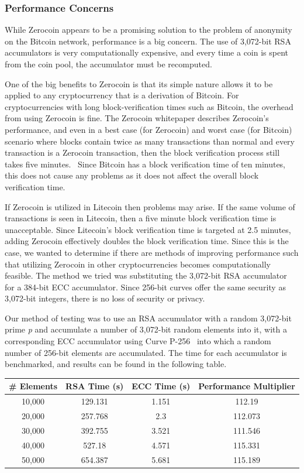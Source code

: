 \documentclass[11pt]{article}
\begin{document}
\subsubsection{Performance Concerns}
While Zerocoin appears to be a promising solution to the problem of anonymity on the Bitcoin network, performance is a
big concern. The use of 3,072-bit RSA accumulators is very computationally expensive, and every time a coin is spent
from the coin pool, the accumulator must be recomputed.

One of the big benefits to Zerocoin is that its simple nature allows it to be applied to any cryptocurrency that is a
derivation of Bitcoin. For cryptocurrencies with long block-verification times such as Bitcoin, the overhead from using
Zerocoin is fine. The Zerocoin whitepaper describes Zerocoin's performance, and even in a best case (for Zerocoin) and
worst case (for Bitcoin) scenario where blocks contain twice as many transactions than normal and every transaction is a
Zerocoin transaction, then the block verification process still takes five minutes.~\cite{miers13} Since Bitcoin has a
block verification time of ten minutes, this does not cause any problems as it does not affect the overall block
verification time.

If Zerocoin is utilized in Litecoin then problems may arise. If the same volume of transactions is seen in Litecoin,
then a five minute block verification time is unacceptable. Since Litecoin's block verification time is targeted at 2.5
minutes, adding Zerocoin effectively doubles the block verification time. Since this is the case, we wanted to determine
if there are methods of improving performance such that utilizing Zerocoin in other cryptocurrencies becomes
computationally feasible. The method we tried was substituting the 3,072-bit RSA accumulator for a 384-bit ECC
accumulator. Since 256-bit curves offer the same security as 3,072-bit integers, there is no loss of security or
privacy.\cite{nistcase}

Our method of testing was to use an RSA accumulator with a random 3,072-bit prime \emph{p} and accumulate a number of
3,072-bit random elements into it, with a corresponding ECC accumulator using Curve P-256~\cite{curves} into which a
random number of 256-bit elements are accumulated. The time for each accumulator is benchmarked, and results can be
found in the following table.
\begin{center}
\begin{tabular}{|c|c|c|c|}
    \hline
    \textbf{\# Elements} & \textbf{RSA Time (s)} & \textbf{ECC Time (s)} & \textbf{Performance Multiplier} \\
    \hline
    10,000 & 129.131 & 1.151 & 112.19 \\
    \hline
    20,000 & 257.768 & 2.3 & 112.073 \\
    \hline
    30,000 & 392.755 & 3.521 & 111.546 \\
    \hline
    40,000 & 527.18 & 4.571 & 115.331 \\
    \hline
    50,000 & 654.387 & 5.681 & 115.189 \\
    \hline
\end{tabular}
\end{center}
\end{document}
